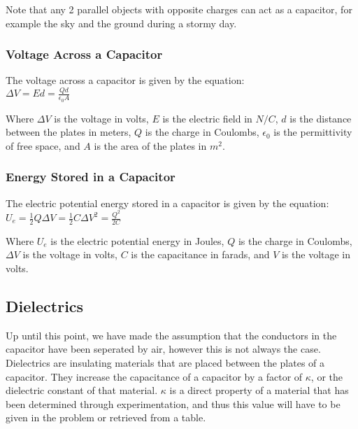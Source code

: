 Note that any 2 parallel objects with opposite charges can act as a capacitor, for example the sky and the ground during a stormy day.\\


\subsubsection*{Voltage Across a Capacitor}

\hspace{.5cm} The voltage across a capacitor is given by the equation:\\

\vbox{
    \center
    $\Delta V = Ed = \frac{Qd}{\epsilon_0 A}$
}
\vspace{12pt}

Where $\Delta V$ is the voltage in volts, $E$ is the electric field in $N/C$, $d$ is the distance between the plates in meters, $Q$ is the charge in Coulombs, $\epsilon_0$ is the permittivity of free space, and $A$ is the area of the plates in $m^2$.\\


\subsubsection*{Energy Stored in a Capacitor}
\hspace{.5cm} The electric potential energy stored in a capacitor is given by the equation:\\
\vbox {
    \center
    $U_e = \frac{1}{2}Q\Delta V = \frac{1}{2}C\Delta V^2 = \frac{Q^2}{2C}$
}
\vspace{12pt}

Where $U_e$ is the electric potential energy in Joules, $Q$ is the charge in Coulombs, $\Delta V$ is the voltage in volts, $C$ is the capacitance in farads, and $V$ is the voltage in volts.\\

\vspace{12pt}
\hrulefill

\begin{center}
    \subsection*{Dielectrics}
\end{center}

\hspace{.5cm} Up until this point, we have made the assumption that the conductors in the capacitor have been seperated by air, however this is not always the case. Dielectrics are insulating materials that are placed between the plates of a capacitor. 
They increase the capacitance of a capacitor by a factor of $\kappa$, or the dielectric constant of that material. $\kappa$ is a direct property of a material that has been determined through experimentation, and thus this value will have to be given
in the problem or retrieved from a table.\\
\pagebreak

